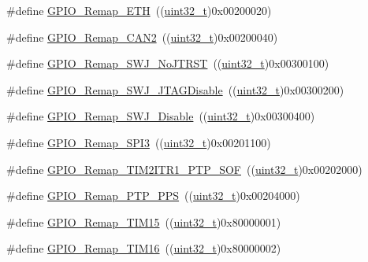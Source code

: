 \begin{DoxyCompactItemize}
\item 
\#define \hyperlink{group___g_p_i_o___remap__define_gaf578688bb4d1a17fb3a103946e7c2eb7}{G\+P\+I\+O\+\_\+\+Remap\+\_\+\+E\+TH}~((\hyperlink{_p_e___types_8h_a33594304e786b158f3fb30289278f5af}{uint32\+\_\+t})0x00200020)
\item 
\#define \hyperlink{group___g_p_i_o___remap__define_ga14c09a5050063b703fa07181afc56ee6}{G\+P\+I\+O\+\_\+\+Remap\+\_\+\+C\+A\+N2}~((\hyperlink{_p_e___types_8h_a33594304e786b158f3fb30289278f5af}{uint32\+\_\+t})0x00200040)
\item 
\#define \hyperlink{group___g_p_i_o___remap__define_ga81009ef35f7f039365291cf4f6fc0c5b}{G\+P\+I\+O\+\_\+\+Remap\+\_\+\+S\+W\+J\+\_\+\+No\+J\+T\+R\+ST}~((\hyperlink{_p_e___types_8h_a33594304e786b158f3fb30289278f5af}{uint32\+\_\+t})0x00300100)
\item 
\#define \hyperlink{group___g_p_i_o___remap__define_ga25fb8c789334694861444e48f486879d}{G\+P\+I\+O\+\_\+\+Remap\+\_\+\+S\+W\+J\+\_\+\+J\+T\+A\+G\+Disable}~((\hyperlink{_p_e___types_8h_a33594304e786b158f3fb30289278f5af}{uint32\+\_\+t})0x00300200)
\item 
\#define \hyperlink{group___g_p_i_o___remap__define_gaf4832412d0ba344bb9147142cfcda828}{G\+P\+I\+O\+\_\+\+Remap\+\_\+\+S\+W\+J\+\_\+\+Disable}~((\hyperlink{_p_e___types_8h_a33594304e786b158f3fb30289278f5af}{uint32\+\_\+t})0x00300400)
\item 
\#define \hyperlink{group___g_p_i_o___remap__define_gac7fd74244a9d53ca02cc86bb6543a689}{G\+P\+I\+O\+\_\+\+Remap\+\_\+\+S\+P\+I3}~((\hyperlink{_p_e___types_8h_a33594304e786b158f3fb30289278f5af}{uint32\+\_\+t})0x00201100)
\item 
\#define \hyperlink{group___g_p_i_o___remap__define_ga0dc4bec540b9372479e63295fe68ac17}{G\+P\+I\+O\+\_\+\+Remap\+\_\+\+T\+I\+M2\+I\+T\+R1\+\_\+\+P\+T\+P\+\_\+\+S\+OF}~((\hyperlink{_p_e___types_8h_a33594304e786b158f3fb30289278f5af}{uint32\+\_\+t})0x00202000)
\item 
\#define \hyperlink{group___g_p_i_o___remap__define_ga3e9d7808d1e50393afde08e4a45d18aa}{G\+P\+I\+O\+\_\+\+Remap\+\_\+\+P\+T\+P\+\_\+\+P\+PS}~((\hyperlink{_p_e___types_8h_a33594304e786b158f3fb30289278f5af}{uint32\+\_\+t})0x00204000)
\item 
\#define \hyperlink{group___g_p_i_o___remap__define_gaead5c447875e8b384945424845452b82}{G\+P\+I\+O\+\_\+\+Remap\+\_\+\+T\+I\+M15}~((\hyperlink{_p_e___types_8h_a33594304e786b158f3fb30289278f5af}{uint32\+\_\+t})0x80000001)
\item 
\#define \hyperlink{group___g_p_i_o___remap__define_gac9d612f9f9f9f66faecbdbbc29d2ac61}{G\+P\+I\+O\+\_\+\+Remap\+\_\+\+T\+I\+M16}~((\hyperlink{_p_e___types_8h_a33594304e786b158f3fb30289278f5af}{uint32\+\_\+t})0x80000002)

\end{DoxyCompactItemize}
